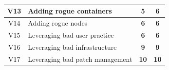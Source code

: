 \begin{table}[H]
{\begin{tabular}{|c|l|c|c|}
V13             & Adding rogue containers                                                                & \textbf{5}     & \textbf{6}     \\ \hline
V14             & Adding rogue nodes                                                                     & \textbf{6}     & \textbf{6}     \\ \hline
V15             & Leveraging bad user practice                                                           & \textbf{6}     & \textbf{6}     \\ \hline
V16             & Leveraging bad infrastructure                                                          & \textbf{9}     & \textbf{9}     \\ \hline
V17             & Leveraging bad patch management                                                        & \textbf{10}    & \textbf{10}    \\ \hline
\end{tabular}%
}
\end{table}

